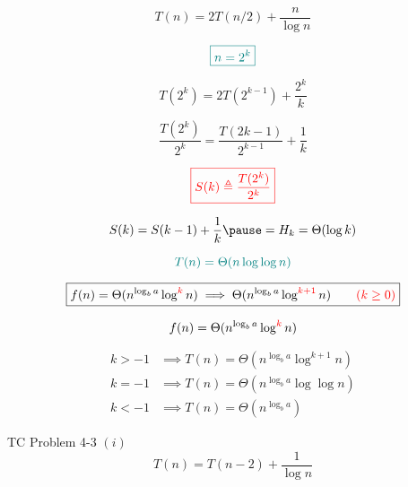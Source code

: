 \begin{frame}{}
  \[
    T(n) = 2T(n/2) + \frac{n}{\log n}
  \]

  \pause
  \[
    \textcolor{teal}{\boxed{n = 2^k}}
  \]

  \pause
  \[
    T(2^k) = 2T(2^{k-1}) + \frac{2^k}{k}
  \]

  \pause
  \[
    \frac{T(2^k)}{2^k} = \frac{T(2{k-1})}{2^{k-1}} + \frac{1}{k}
  \]

  \pause
  \[
    \textcolor{red}{\boxed{S(k) \triangleq \frac{T(2^k)}{2^k}}}
  \]

  \pause
  \[
    S(k) = S(k-1) + \frac{1}{k} \pause = H_k = \Theta(\log k)
  \]

  \pause
  \[
    \textcolor{teal}{T(n) = \Theta(n \log \log n)}
  \]
\end{frame}

\begin{frame}{}
  \[
    \boxed{f(n) = \Theta(n^{\log_b a} \log^{\textcolor{red}{k}}n) \implies \Theta(n^{\log_b a} \log^{\textcolor{red}{k+1}}n) \qquad \textcolor{red}{(k \ge 0)}}
  \]

  \pause
  \begin{center}
    \href{https://en.wikipedia.org/wiki/Master\_theorem\_(analysis\_of\_algorithms)}{}
  \end{center}

  \pause
  \[
    f(n) = \Theta(n^{\log_b a} \log^{\textcolor{red}{k}}n)
  \]

  \pause
  \begin{align*}
    k > -1 &\implies T(n) = \Theta(n^{\log_b a} \log^{k+1} n) \\[8pt]
    k = -1 &\implies T(n) = \Theta(n^{\log_b a} \log \log n) \\[8pt]
    k < -1 &\implies T(n) = \Theta(n^{\log_b a})
  \end{align*}
\end{frame}


\begin{frame}{}
  \begin{exampleblock}{TC Problem 4-3 $(i)$}
    \[
      T(n) = T(n-2) + \frac{1}{\log n}
    \]
  \end{exampleblock}
\end{frame}

